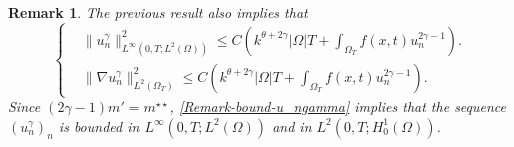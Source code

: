 \documentclass{amsart}
\numberwithin{equation}{section}
\newtheorem{remark}[example]{Remark}
\def\elle#1{L^{#1}}
\def\elleom#1{L^{#1}(\Omega)}
\def\elleomT#1{L^{#1}(\Omega_T)}
\def\Hom{H^1_0(\Omega)}
\def\ioT{\int_{\Omega_T}}
\def\norma#1#2{ \|#1 \|_{#2}}
\newcommand{\abs}[1]{\left|#1\right|}
\begin{document}
\begin{remark}\label{Stima-u_ngamma-bad}
    The previous result also implies that
    \begin{equation}\label{Remark-bound-u_ngamma}
        \left\{\begin{aligned}
        & \norma{u_n^\gamma}{\elle\infty(0,T;\elleom2)}^2\leq C\left(k^{\theta+2\gamma}\abs{\Omega}T+\ioT f(x,t)u_n^{2\gamma-1}\right).\\
        & \norma{\nabla u_n^\gamma}{\elleomT2}^2\leq C\left(k^{\theta+2\gamma}\abs{\Omega}T+\ioT f(x,t)u_n^{2\gamma-1}\right).
        \end{aligned}\right.
    \end{equation}
    Since $(2\gamma-1)m'=m^{\star\star}$, \eqref{Remark-bound-u_ngamma} implies that the sequence $(u_n^\gamma)_n$ is bounded in $\elle\infty(0,T;\elleom2)$ and in $\elle2(0,T;\Hom)$.
\end{remark}
\end{document}
